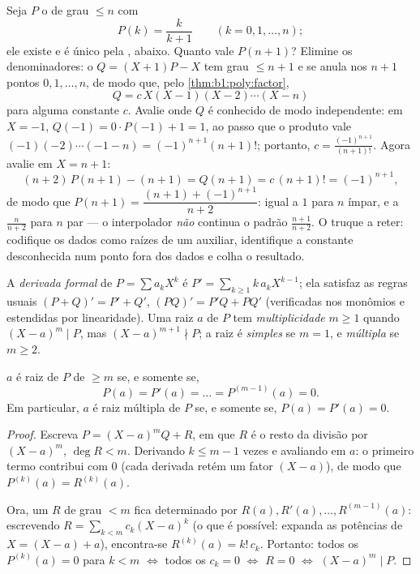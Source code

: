 \begin{example}\label{ex:b1:poly:auxiliary}
Seja $P$ o  de grau $\leq n$ com
\[
P(k) = \frac{k}{k+1} \qquad (k = 0, 1, \dots, n) ;
\]
ele existe e é único pela , abaixo. Quanto vale
$P(n+1)$? Elimine os denominadores: o  $Q = (X+1)P - X$ tem
grau $\leq n + 1$ e se anula nos $n + 1$ pontos $0, 1,
\dots, n$, de modo que, pelo \cref{thm:b1:poly:factor},
\[
Q = c\,X(X-1)(X-2)\cdots(X-n)
\]
para alguma constante $c$. Avalie onde $Q$ é conhecido de modo
independente: em $X = -1$, $Q(-1) = 0 \cdot P(-1) + 1 = 1$, ao passo que o produto
vale $(-1)(-2)\cdots(-1-n) = (-1)^{n+1}(n+1)!$; portanto, $c =
\frac{(-1)^{n+1}}{(n+1)!}$. Agora avalie em $X = n + 1$:
\[
(n+2)\,P(n+1) - (n+1) = Q(n+1) = c\,(n+1)! = (-1)^{n+1} ,
\]
de modo que $P(n+1) = \dfrac{(n+1) + (-1)^{n+1}}{n+2}$: igual a $1$ para
$n$ ímpar, e a $\frac{n}{n+2}$ para $n$ par --- o
 interpolador \emph{não} continua o padrão
$\frac{n+1}{n+2}$. O truque a reter: codifique os dados como
raízes de um  auxiliar, identifique a constante desconhecida
num ponto fora dos dados e colha o resultado.
\end{example}

\begin{definition}\label{def:b1:poly:derivative}
A \emph{derivada formal} de $P = \sum a_k X^k$ é $P' = \sum_{k
\geq 1} k\,a_k X^{k-1}$; ela satisfaz as regras usuais $(P+Q)' = P' +
Q'$, $(PQ)' = P'Q + PQ'$ (verificadas nos monômios e estendidas por
linearidade). Uma raiz $a$ de $P$ tem
\emph{multiplicidade} $m \geq 1$ quando
$(X-a)^m \mid P$, mas $(X-a)^{m+1} \nmid P$; a raiz é \emph{simples}
se $m = 1$, e \emph{múltipla} se $m \geq 2$.
\end{definition}

\begin{proposition}\label{prop:b1:poly:multiplicity}
$a$ é raiz de $P$ de  $\geq m$ se, e somente se,
\[
P(a) = P'(a) = \dots = P^{(m-1)}(a) = 0 .
\]
Em particular, $a$ é raiz múltipla de $P$ se, e somente se, $P(a) =
P'(a) = 0$.
\end{proposition}

\begin{proof}
Escreva $P = (X - a)^m Q + R$, em que $R$ é o resto da divisão
por $(X-a)^m$, $\deg R < m$. Derivando $k \leq m - 1$ vezes e
avaliando em $a$: o primeiro termo contribui com $0$ (cada derivada
retém um fator $(X-a)$), de modo que $P^{(k)}(a) = R^{(k)}(a)$.

Ora, um  $R$ de grau $< m$ fica determinado por $R(a), R'(a),
\dots, R^{(m-1)}(a)$: escrevendo $R = \sum_{k < m} c_k (X - a)^k$
(o que é possível: expanda as potências de $X = (X - a) + a$), encontra-se
$R^{(k)}(a) = k!\, c_k$. Portanto: todos os $P^{(k)}(a) = 0$ para $k < m$
$\iff$ todos os $c_k = 0$ $\iff$ $R = 0$ $\iff$ $(X-a)^m \mid P$.
\end{proof}

